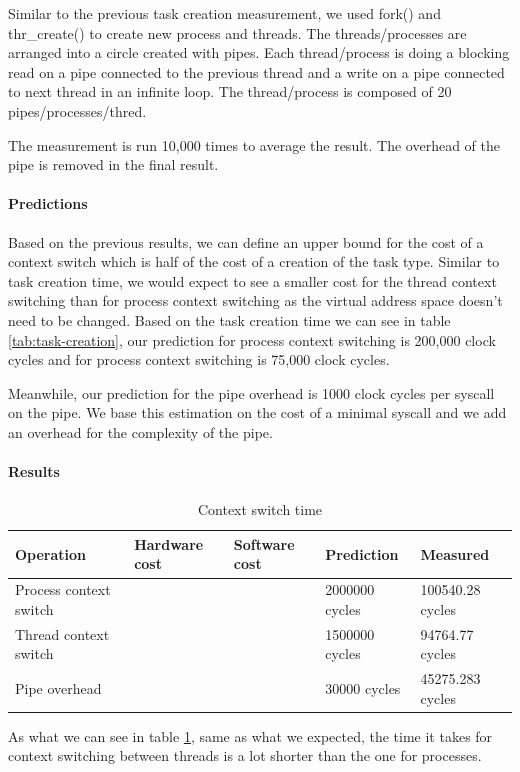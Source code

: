 Similar to the previous task creation measurement, we used fork() and
thr\_create() to create new process and threads.
The threads/processes are arranged into a circle created with pipes.
Each thread/process is doing a blocking read on a pipe connected to the previous
thread and a write on a pipe connected to next thread in an infinite loop.
The thread/process is composed of 20 pipes/processes/thred.

The measurement is run 10,000 times to average the result.
The overhead of the pipe is removed in the final result.

\paragraph{Predictions}
Based on the previous results, we can define an upper bound for the cost of a
context switch which is half of the cost of a creation of the task type.
Similar to task creation time, we would expect to see a smaller cost
for the thread context switching than for process context switching as the virtual
address space doesn't need to be changed.
Based on the task creation time we can see in table \ref{tab:task-creation},
our prediction for process context switching is 200,000 clock
cycles and for process context switching is 75,000 clock cycles.

Meanwhile, our prediction for the pipe overhead is 1000 clock cycles per syscall
on the pipe.
We base this estimation on the cost of a minimal syscall and we add an overhead
for the complexity of the pipe.

\paragraph{Results}
\begin{table}
\begin{center}
\begin{tabular}{| l | l | l | l | l |}
\hline
Operation 		& Hardware cost 	& Software cost 	& Prediction 	& Measured \\ \hline
Process context switch 	& 		& 	&2000000 cycles	& 100540.28 cycles \\ \hline
Thread context switch 	& 		&		&1500000 cycles	& 94764.77 cycles \\ \hline
Pipe overhead		& 		&		&30000 cycles	& 45275.283 cycles \\ \hline
\hline
\end{tabular}
\end{center}

\caption{Context switch time\label{tab:context-switch-time}}
\end{table}
As what we can see in table \ref{tab:context-switch-time}, same as what we expected, the time it takes for context switching between threads is a lot shorter than the one for processes.

